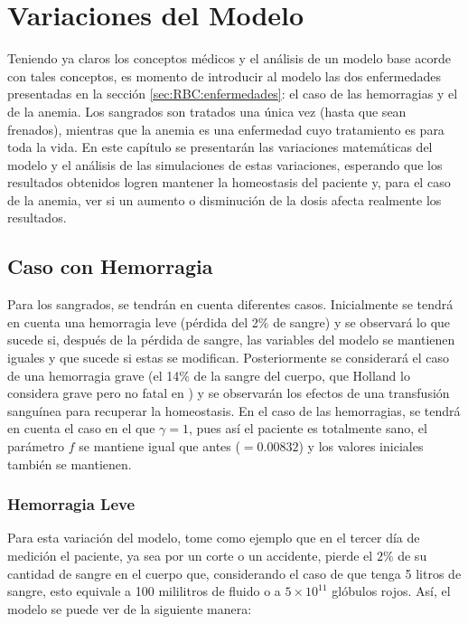 \chapter{Variaciones del Modelo}\label{chap:variaciones}

Teniendo ya claros los conceptos médicos y el análisis de un modelo base acorde con tales conceptos, es momento de introducir al modelo las dos enfermedades presentadas en la sección \ref{sec:RBC:enfermedades}: el caso de las hemorragias y el de la anemia. Los sangrados son tratados una única vez (hasta que sean frenados), mientras que la anemia es una enfermedad cuyo tratamiento es para toda la vida. En este capítulo se presentarán las variaciones matemáticas del modelo y el análisis de las simulaciones de estas variaciones, esperando que los resultados obtenidos logren mantener la homeostasis del paciente y, para el caso de la anemia, ver si un aumento o disminución de la dosis afecta realmente los resultados.

\section{Caso con Hemorragia}\label{Sec:variaciones:hemorragia}

Para los sangrados, se tendrán en cuenta diferentes casos. Inicialmente se tendrá en cuenta una hemorragia leve (pérdida del 2$\%$ de sangre) y se observará lo que sucede si, después de la pérdida de sangre, las variables del modelo se mantienen iguales y que sucede si estas se modifican. Posteriormente se considerará el caso de una hemorragia grave (el 14$\%$ de la sangre del cuerpo, que Holland lo considera grave pero no fatal en \cite{PerdidaSangre}) y se observarán los efectos de una transfusión sanguínea para recuperar la homeostasis. En el caso de las hemorragias, se tendrá en cuenta el caso en el que $\gamma =1$, pues así el paciente es totalmente sano, el parámetro $f$ se mantiene igual que antes ($=0.00832$) y los valores iniciales también se mantienen.

\subsection{Hemorragia Leve}\label{subsec:variaciones:hemorragia:leve}

Para esta variación del modelo, tome como ejemplo que en el tercer día de medición el paciente, ya sea por un corte o un accidente, pierde el $2\%$ de su cantidad de sangre en el cuerpo que, considerando el caso de que tenga 5 litros de sangre, esto equivale a 100 mililitros de fluido o a $5\times 10^{11}$ glóbulos rojos. Así, el modelo se puede ver de la siguiente manera:


